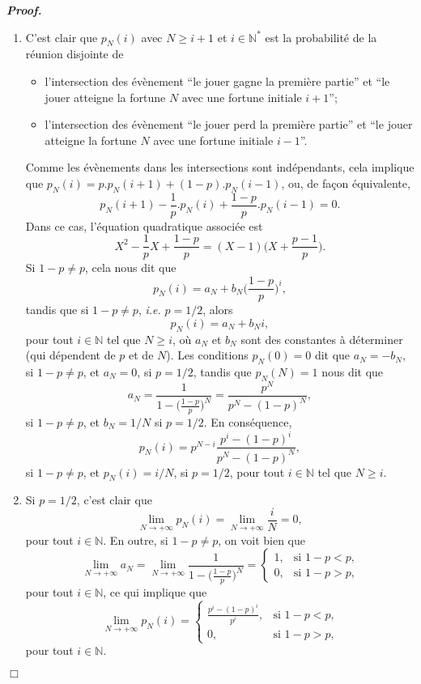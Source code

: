 \documentclass[11pt,a4paper]{article}
\newcommand{\NN}{\mathbb{N}}
\newenvironment{preuve}[1][]
{\vskip 2mm  \noindent\emph{\bf Proof#1. }}{$\Box$ \vskip 2mm}
\let\geq\geqslant
\begin{document}
\begin{preuve}
\begin{enumerate}
\begin{enumerate}[label=(\roman*)]
					\item C'est clair que $p_N(i)$ avec $N \geq i+1$ et $i \in \NN^{*}$ est la probabilité de la réunion disjointe de 
					\begin{itemize} 
						\item l'intersection des évènement ``le jouer gagne la première partie'' et ``le jouer atteigne la fortune $N$ avec une fortune initiale $i+1$'';
						\item l'intersection des évènement ``le jouer perd la première partie'' et ``le jouer atteigne la fortune $N$ avec une fortune initiale $i-1$''.
					\end{itemize}
					Comme les évènements dans les intersections sont indépendants, cela implique que $p_N(i) = p . p_{N}(i+1) + (1-p) . p_{N}(i-1)$, ou, 
					de façon équivalente, 
					\[     p_N(i+1) - \frac{1}{p} . p_{N}(i) + \frac{1-p}{p} . p_{N}(i-1) = 0.     \]
					Dans ce cas, l'équation quadratique associée est 
					\[     X^{2} - \frac{1}{p} X + \frac{1-p}{p} = (X-1) \bigg(X + \frac{p-1}{p}\bigg).     \]
					Si $1-p \neq p$, cela nous dit que 
					\[     p_{N}(i) = a_{N} + b_{N} \bigg(\frac{1-p}{p}\bigg)^{i},     \]
					tandis que si $1-p \neq p$, \textit{i.e.} $p= 1/2$, alors 
					\[     p_{N}(i) = a_{N} + b_{N} i,     \]
					pour tout $i \in \NN$ tel que $N \geq i$, où $a_{N}$ et $b_{N}$ sont des constantes à déterminer (qui dépendent de $p$ et de $N$). 
					Les conditions $p_{N}(0)= 0$ dit que $a_{N} = -b_{N}$, si $1-p \neq p$, et $a_{N} = 0$, si $p=1/2$, 
					tandis que $p_{N}(N)= 1$ nous dit que 
					\[     a_{N} = \frac{1}{1 - \bigg(\frac{1-p}{p}\bigg)^{N}} = \frac{p^{N}}{p^{N} - (1-p)^{N}},     \]
					si $1-p \neq p$, et $b_{N} = 1/N$ si $p=1/2$.
					En conséquence, 
					\[     p_{N}(i) = p^{N-i} \frac{p^{i} - (1-p)^{i}}{p^{N} - (1-p)^{N}},     \]
					si $1-p \neq p$, et $p_{N}(i) = i/N$, si $p=1/2$, pour tout $i \in \NN$ tel que $N \geq i$.
					
					\item Si $p=1/2$, c'est clair que 
					\[     \underset{N \rightarrow + \infty}{\lim} p_{N}(i) = \underset{N \rightarrow + \infty}{\lim} \frac{i}{N} = 0,     \]
					pour tout $i \in \NN$. 
					En outre, si $1-p \neq p$, on voit bien que 
					\[     \underset{N \rightarrow + \infty}{\lim} a_{N} = \underset{N \rightarrow + \infty}{\lim} \frac{1}{1 - \bigg(\frac{1-p}{p}\bigg)^{N}} = \begin{cases}
					1, &\text{si $1- p < p$,}
					\\
					0, &\text{si $1- p > p$,}
					\end{cases}     \]
					pour tout $i \in \NN$, ce qui implique que 
					\[     \underset{N \rightarrow + \infty}{\lim} p_{N}(i) = \begin{cases}
					\frac{p^{i} - (1-p)^{i}}{p^{i} }, &\text{si $1- p < p$,}
					\\
					0, &\text{si $1- p > p$,}
					\end{cases}     \]
					pour tout $i \in \NN$. 
				\end{enumerate}
			\end{enumerate}
		\end{preuve}
		
\end{document}
